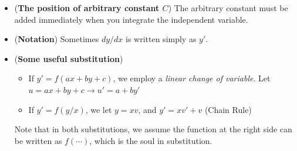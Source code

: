 \documentclass[10pt, landscape]{article}
\begin{document}
\begin{multicols}{4}
\begin{enumerate}
    \begin{itemize}
        \item (\textbf{The position of arbitrary constant $C$}) The arbitrary constant must be added immediately when you integrate the independent variable.
        \item (\textbf{Notation}) Sometimes $dy/dx$ is written simply as $y'$.
        \item (\textbf{Some useful substitution})
        \begin{itemize}
            \item If $y'=f(ax+by+c)$, we employ a \textit{linear change of variable}. Let $u=ax+by+c\rightarrow u'=a+by'$
            \item If $y'=f(y/x)$, we let $y=xv$, and $y'=xv'+v$ (Chain Rule)
        \end{itemize}
        Note that in both substitutions, we assume the function at the right side can be written as $f(\cdots)$, which is the soul in substitution.
    \end{itemize}
\end{enumerate}

\end{multicols}
\end{document}
